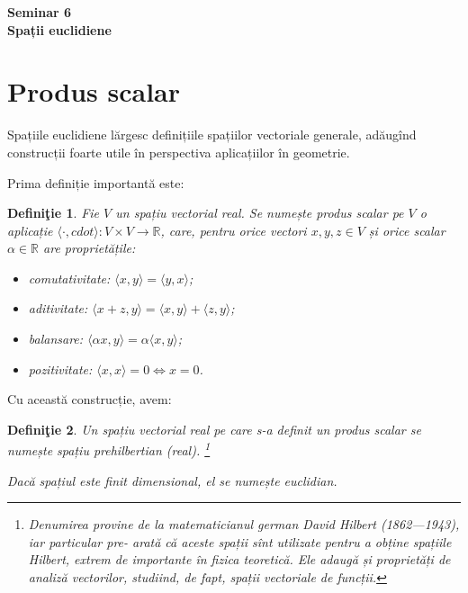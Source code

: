\documentclass[11pt,a4paper]{article}
\newcommand\RR{\mathbb{R}}
\theoremstyle{dotless}
\theoremstyle{dotlessdr}
\newtheorem{definition}{Defini\c{t}ie}[section]
\begin{document}
\begin{center}
  {\large\textbf{Seminar 6 \\
    Spații euclidiene}}
\end{center}

\vspace{1cm}

\section{Produs scalar}
\label{sec:teorie}

Spațiile euclidiene lărgesc definițiile spațiilor vectoriale generale,
adăugînd construcții foarte utile în perspectiva aplicațiilor în geometrie.

Prima definiție importantă este:

\begin{definition}\label{def:prod-sc}
  Fie $V$ un spațiu vectorial real. Se numește \emph{produs scalar} pe $V$
  o aplicație $\langle \cdot, cdot \rangle : V \times V \to \RR$, care, pentru orice
  vectori $x, y, z \in V$ și orice scalar $\alpha \in \RR$ are proprietățile:
  \begin{itemize}
  \item \emph{comutativitate:} $\langle x, y \rangle = \langle y, x \rangle$;
  \item \emph{aditivitate:} $\langle x + z, y \rangle = \langle x, y \rangle + %
    \langle z, y \rangle$;
  \item \emph{balansare:} $\langle \alpha x, y \rangle = \alpha \langle x, y \rangle$;
  \item \emph{pozitivitate:} $\langle x, x \rangle = 0 \Leftrightarrow x = 0$.
  \end{itemize}
\end{definition}

Cu această construcție, avem:

\begin{definition}\label{def:preh-euc}
  Un spațiu vectorial real pe care s-a definit un produs scalar se numește
  \emph{spațiu prehilbertian (real)}. \footnote{Denumirea provine de la %
    matematicianul german David Hilbert (1862---1943), iar particular \emph{pre-} arată %
    că aceste spații sînt utilizate pentru a obține \emph{spațiile Hilbert}, extrem %
    de importante în fizica teoretică. Ele adaugă și proprietăți de analiză %
    vectorilor, studiind, de fapt, \emph{spații vectoriale de funcții}.}

  Dacă spațiul este finit dimensional, el se numește \emph{euclidian}.
\end{definition}
\end{document}
